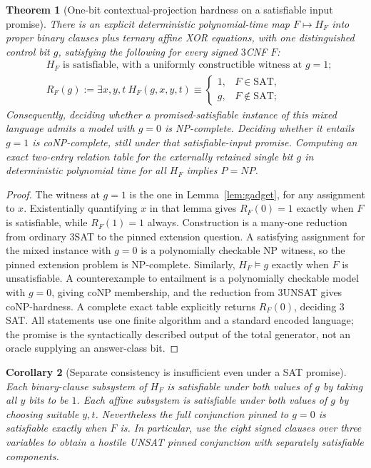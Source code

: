 \documentclass[11pt]{article}
\newtheorem{theorem}{Theorem}
\newtheorem{corollary}[theorem]{Corollary}
\begin{document}
\begin{theorem}[One-bit contextual-projection hardness on a satisfiable input promise]\label{thm:main}
There is an explicit deterministic polynomial-time map $F\mapsto H_F$ into proper binary clauses plus ternary affine XOR equations, with one distinguished control bit $g$, satisfying the following for \emph{every} signed $3$CNF $F$:
\begin{align}
 &H_F\text{ is satisfiable, with a uniformly constructible witness at }g=1;\\
 &R_F(g):=\exists x,y,t\ H_F(g,x,y,t)
   \equiv\begin{cases}1,&F\in\mathrm{SAT},\\g,&F\notin\mathrm{SAT};\end{cases} \label{eq:onebit}
\end{align}
Consequently, deciding whether a promised-satisfiable instance of this mixed language admits a model with $g=0$ is NP-complete. Deciding whether it \emph{entails} $g=1$ is coNP-complete, still under that satisfiable-input promise. Computing an exact two-entry relation table for the externally retained \emph{single} bit $g$ in deterministic polynomial time for all $H_F$ implies $P=NP$.
\end{theorem}
\begin{proof}
The witness at $g=1$ is the one in Lemma~\ref{lem:gadget}, for any assignment to $x$. Existentially quantifying $x$ in that lemma gives $R_F(0)=1$ exactly when $F$ is satisfiable, while $R_F(1)=1$ always. Construction is a many-one reduction from ordinary $3$SAT to the pinned extension question. A satisfying assignment for the mixed instance with $g=0$ is a polynomially checkable NP witness, so the pinned extension problem is NP-complete. Similarly, $H_F\models g$ exactly when $F$ is unsatisfiable. A counterexample to entailment is a polynomially checkable model with $g=0$, giving coNP membership, and the reduction from $3$UNSAT gives coNP-hardness. A complete exact table explicitly returns $R_F(0)$, deciding $3$SAT. All statements use one finite algorithm and a standard encoded language; the promise is the syntactically described output of the total generator, not an oracle supplying an answer-class bit.
\end{proof}

\begin{corollary}[Separate consistency is insufficient even under a SAT promise]
Each binary-clause subsystem of $H_F$ is satisfiable under both values of $g$ by taking all $y$ bits to be $1$. Each affine subsystem is satisfiable under both values of $g$ by choosing suitable $y,t$. Nevertheless the full conjunction pinned to $g=0$ is satisfiable exactly when $F$ is. In particular, use the eight signed clauses over three variables to obtain a hostile UNSAT pinned conjunction with separately satisfiable components.
\end{corollary}
\end{document}
